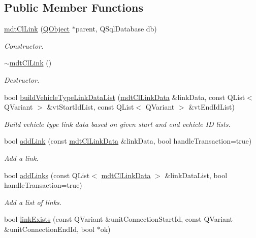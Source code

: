 \subsection*{Public Member Functions}
\begin{DoxyCompactItemize}
\item 
\hyperlink{classmdt_cl_link_a5cef1766f2f03106227227582eed0245}{mdt\-Cl\-Link} (\hyperlink{class_q_object}{Q\-Object} $\ast$parent, Q\-Sql\-Database db)
\begin{DoxyCompactList}\small\item\em Constructor. \end{DoxyCompactList}\item 
\hyperlink{classmdt_cl_link_a1fa6ad3a2ecc7c5f2851c95152a7ed94}{$\sim$mdt\-Cl\-Link} ()
\begin{DoxyCompactList}\small\item\em Destructor. \end{DoxyCompactList}\item 
bool \hyperlink{classmdt_cl_link_aaf2a931c22263b7b5a573fbaf5ae2dc5}{build\-Vehicle\-Type\-Link\-Data\-List} (\hyperlink{classmdt_cl_link_data}{mdt\-Cl\-Link\-Data} \&link\-Data, const Q\-List$<$ Q\-Variant $>$ \&vt\-Start\-Id\-List, const Q\-List$<$ Q\-Variant $>$ \&vt\-End\-Id\-List)
\begin{DoxyCompactList}\small\item\em Build vehicle type link data based on given start and end vehicle I\-D lists. \end{DoxyCompactList}\item 
bool \hyperlink{classmdt_cl_link_a65c1cc934c0f9b37434dbb44964623b1}{add\-Link} (const \hyperlink{classmdt_cl_link_data}{mdt\-Cl\-Link\-Data} \&link\-Data, bool handle\-Transaction=true)
\begin{DoxyCompactList}\small\item\em Add a link. \end{DoxyCompactList}\item 
bool \hyperlink{classmdt_cl_link_adeb5674e94942568e149d68c46caaf50}{add\-Links} (const Q\-List$<$ \hyperlink{classmdt_cl_link_data}{mdt\-Cl\-Link\-Data} $>$ \&link\-Data\-List, bool handle\-Transaction=true)
\begin{DoxyCompactList}\small\item\em Add a list of links. \end{DoxyCompactList}\item 
bool \hyperlink{classmdt_cl_link_aaf2bcec69c5108f45b1e2189978c07c6}{link\-Exists} (const Q\-Variant \&unit\-Connection\-Start\-Id, const Q\-Variant \&unit\-Connection\-End\-Id, bool $\ast$ok)

\end{DoxyCompactItemize}

